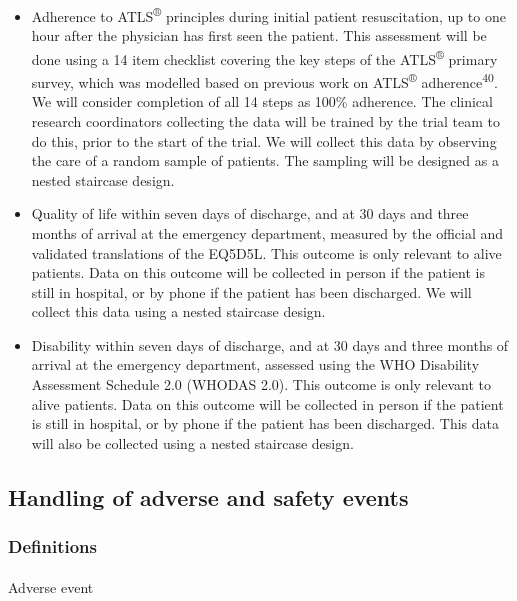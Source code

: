 \documentclass[
]{scrartcl}
\makeatletter
\let\oldparagraph\paragraph
\renewcommand{\paragraph}{
    \@ifstar
      \xxxParagraphStar
      \xxxParagraphNoStar
  }
\newcommand{\xxxParagraphStar}[1]{\oldparagraph*{#1}\mbox{}}
\newcommand{\xxxParagraphNoStar}[1]{\oldparagraph{#1}\mbox{}}
\providecommand{\tightlist}{%
  \setlength{\itemsep}{0pt}\setlength{\parskip}{0pt}}\usepackage{longtable,booktabs,array}
\makeatother
\begin{document}
\begin{itemize}
\tightlist
\item
  Adherence to ATLS\textsuperscript{®} principles during initial patient
  resuscitation, up to one hour after the physician has first seen the
  patient. This assessment will be done using a 14 item checklist
  covering the key steps of the ATLS\textsuperscript{®} primary survey,
  which was modelled based on previous work on ATLS\textsuperscript{®}
  adherence\textsuperscript{40}. We will consider completion of all 14
  steps as 100\% adherence. The clinical research coordinators
  collecting the data will be trained by the trial team to do this,
  prior to the start of the trial. We will collect this data by
  observing the care of a random sample of patients. The sampling will
  be designed as a nested staircase design.
\item
  Quality of life within seven days of discharge, and at 30 days and
  three months of arrival at the emergency department, measured by the
  official and validated translations of the EQ5D5L. This outcome is
  only relevant to alive patients. Data on this outcome will be
  collected in person if the patient is still in hospital, or by phone
  if the patient has been discharged. We will collect this data using a
  nested staircase design.
\item
  Disability within seven days of discharge, and at 30 days and three
  months of arrival at the emergency department, assessed using the WHO
  Disability Assessment Schedule 2.0 (WHODAS 2.0). This outcome is only
  relevant to alive patients. Data on this outcome will be collected in
  person if the patient is still in hospital, or by phone if the patient
  has been discharged. This data will also be collected using a nested
  staircase design.
\end{itemize}

\subsection{Handling of adverse and safety
events}\label{handling-of-adverse-and-safety-events}

\subsubsection{Definitions}\label{definitions}

\paragraph{Adverse event}\label{adverse-event}
\end{document}
